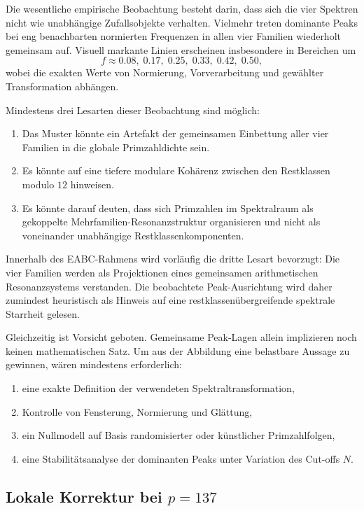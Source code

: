 \documentclass[11pt,a4paper]{amsart}
\theoremstyle{plain}
\theoremstyle{definition}
\theoremstyle{remark}
\begin{document}
	Die wesentliche empirische Beobachtung besteht darin, dass sich die vier Spektren nicht wie unabhängige Zufallsobjekte verhalten. Vielmehr treten dominante Peaks bei eng benachbarten normierten Frequenzen in allen vier Familien wiederholt gemeinsam auf. Visuell markante Linien erscheinen insbesondere in Bereichen um
	\[
	f \approx 0.08,\;0.17,\;0.25,\;0.33,\;0.42,\;0.50,
	\]
	wobei die exakten Werte von Normierung, Vorverarbeitung und gewählter Transformation abhängen.
	
	Mindestens drei Lesarten dieser Beobachtung sind möglich:
	\begin{enumerate}[label=\arabic*.]
		\item Das Muster könnte ein Artefakt der gemeinsamen Einbettung aller vier Familien in die globale Primzahldichte sein.
		\item Es könnte auf eine tiefere modulare Kohärenz zwischen den Restklassen modulo \(12\) hinweisen.
		\item Es könnte darauf deuten, dass sich Primzahlen im Spektralraum als gekoppelte Mehrfamilien-Resonanzstruktur organisieren und nicht als voneinander unabhängige Restklassenkomponenten.
	\end{enumerate}
	
	Innerhalb des EABC-Rahmens wird vorläufig die dritte Lesart bevorzugt: Die vier Familien werden als Projektionen eines gemeinsamen arithmetischen Resonanzsystems verstanden. Die beobachtete Peak-Ausrichtung wird daher zumindest heuristisch als Hinweis auf eine restklassenübergreifende spektrale Starrheit gelesen.
	
	Gleichzeitig ist Vorsicht geboten. Gemeinsame Peak-Lagen allein implizieren noch keinen mathematischen Satz. Um aus der Abbildung eine belastbare Aussage zu gewinnen, wären mindestens erforderlich:
	\begin{enumerate}[label=\alph*)]
		\item eine exakte Definition der verwendeten Spektraltransformation,
		\item Kontrolle von Fensterung, Normierung und Glättung,
		\item ein Nullmodell auf Basis randomisierter oder künstlicher Primzahlfolgen,
		\item eine Stabilitätsanalyse der dominanten Peaks unter Variation des Cut-offs \(N\).
	\end{enumerate}
	
	\subsection{Lokale Korrektur bei \(p=137\)}
	
\end{document}
